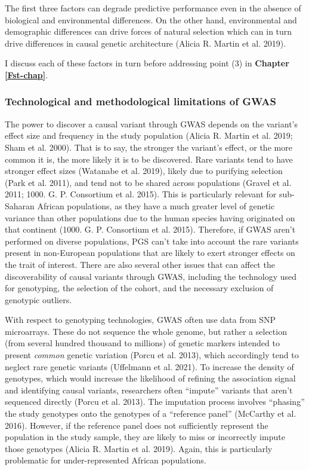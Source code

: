 \documentclass[
]{book}
\begin{document}
The first three factors can degrade predictive performance even in the absence of biological and environmental differences. On the other hand, environmental and demographic differences can drive forces of natural selection which can in turn drive differences in causal genetic architecture (Alicia R. Martin et al. 2019).

I discuss each of these factors in turn before addressing point (3) in \textbf{Chapter \ref{Fst-chap}}.

\hypertarget{fst-discovery-sec}{%
\subsubsection{Technological and methodological limitations of GWAS}\label{fst-discovery-sec}}

The power to discover a causal variant through GWAS depends on the variant's effect size and frequency in the study population (Alicia R. Martin et al. 2019; Sham et al. 2000). That is to say, the stronger the variant's effect, or the more common it is, the more likely it is to be discovered. Rare variants tend to have stronger effect sizes (Watanabe et al. 2019), likely due to purifying selection (Park et al. 2011), and tend not to be shared across populations (Gravel et al. 2011; 1000. G. P. Consortium et al. 2015). This is particularly relevant for sub-Saharan African populations, as they have a much greater level of genetic variance than other populations due to the human species having originated on that continent (1000. G. P. Consortium et al. 2015). Therefore, if GWAS aren't performed on diverse populations, PGS can't take into account the rare variants present in non-European populations that are likely to exert stronger effects on the trait of interest. There are also several other issues that can affect the discoverability of causal variants through GWAS, including the technology used for genotyping, the selection of the cohort, and the necessary exclusion of genotypic outliers.

With respect to genotyping technologies, GWAS often use data from SNP microarrays. These do not sequence the whole genome, but rather a selection (from several hundred thousand to millions) of genetic markers intended to present \emph{common} genetic variation (Porcu et al. 2013), which accordingly tend to neglect rare genetic variants (Uffelmann et al. 2021). To increase the density of genotypes, which would increase the likelihood of refining the association signal and identifying causal variants, researchers often ``impute'' variants that aren't sequenced directly (Porcu et al. 2013). The imputation process involves ``phasing'' the study genotypes onto the genotypes of a ``reference panel'' (McCarthy et al. 2016). However, if the reference panel does not sufficiently represent the population in the study sample, they are likely to miss or incorrectly impute those genotypes (Alicia R. Martin et al. 2019). Again, this is particularly problematic for under-represented African populations.
\end{document}
